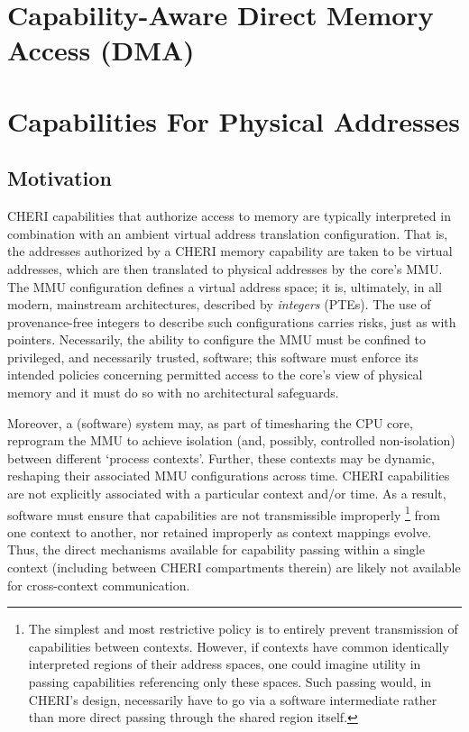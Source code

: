 

\section{Capability-Aware Direct Memory Access (DMA)}
\label{app:exp:dma}


\section{Capabilities For Physical Addresses} %
\label{app:exp:physcap}

\subsection{Motivation}

CHERI capabilities that authorize access to memory are typically interpreted
in combination with an ambient virtual address translation configuration.
That is, the addresses authorized by a CHERI memory capability are taken to
be virtual addresses, which are then translated to physical addresses by the
core's MMU.  The MMU configuration defines a virtual address space; it is,
ultimately, in all modern, mainstream architectures, described by
\emph{integers} (PTEs).
The use of provenance-free integers to describe such configurations carries
risks, just as with pointers.  Necessarily, the ability to configure the MMU
must be confined to privileged, and necessarily trusted, software; this
software must enforce its intended policies concerning permitted access to
the core's view of physical memory and it must do so with no architectural
safeguards.

Moreover, a (software) system may, as part of timesharing the CPU core,
reprogram the MMU to achieve isolation (and, possibly, controlled
non-isolation) between different `process contexts'.  Further, these
contexts may be dynamic, reshaping their associated MMU configurations
across time.  CHERI capabilities are not explicitly associated with a
particular context and/or time.  As a result, software must ensure that
capabilities are not transmissible improperly%
%
\footnote{The simplest and most restrictive policy is to entirely prevent
transmission of capabilities between contexts.  However, if contexts have
common identically interpreted regions of their address spaces, one could
imagine utility in passing capabilities referencing only these spaces.  Such
passing would, in CHERI's design, necessarily have to go via a software
intermediate rather than more direct passing through the shared region
itself.}
%
from one context to another, nor retained improperly as context mappings
evolve.  Thus, the direct mechanisms available for capability passing within
a single context (including between CHERI compartments therein) are likely
not available for cross-context communication.


